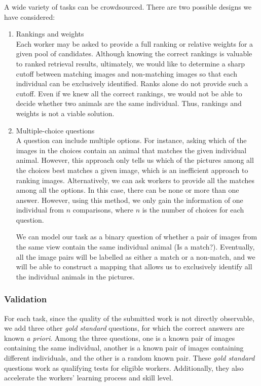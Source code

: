 A wide variety of tasks can be crowdsourced. There are two possible designs we
have considered:
\begin{enumerate}
	\item Rankings and weights \\
    Each worker may be asked to provide a full ranking or relative weights
    for a given pool of candidates. Although knowing the correct rankings is
    valuable to ranked retrieval results,
    ultimately, we would like to determine a sharp cutoff between matching
    images and non-matching images so that each individual can be exclusively
    identified. Ranks alone do not provide such a cutoff. Even if we knew all the
    correct rankings, we would not be able to decide whether two animals are
    the same individual. Thus, rankings and weights is not a viable
    solution.
	\item Multiple-choice questions \\
    A question can include multiple options. For instance, asking which of the images
    in the choices contain an animal that matches the given individual
    animal. However, this approach only tells us which of the pictures among
    all the choices best matches a given image, which is an inefficient
    approach to ranking images. Alternatively, we can ask workers to provide
    all the matches among all the options. In this case, there can be none or
    more than one answer. However, using this method, we only gain the
    information of one individual from $n$ comparisons, where $n$ is the number
    of choices for each question.

    We can model our task as a binary question of whether a pair of images from
    the same view contain the same individual animal (Is a match?).
    Eventually, all the image pairs will be labelled as either a match or a
    non-match, and we will be able to construct a mapping that allows us to
    exclusively identify all the individual animals in the pictures.
\end{enumerate}

\subsubsection{Validation}
\label{subsub:validation}

For each task, since the quality of the submitted work is not directly
observable, we add three other \emph{gold standard} questions, for which the
correct answers are known \emph{a priori}. Among the three questions, one is a known
pair of images containing the same individual, another is a known pair of
images containing different individuals, and the other is a random known pair.
These \emph{gold standard} questions work as qualifying tests for eligible
workers. Additionally, they also accelerate the workers' learning process and
skill level.

